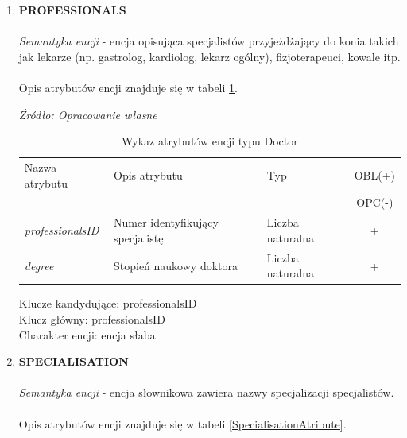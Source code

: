 \documentclass[12pt,twoside]{report}
\begin{document}
\begin{enumerate}[start=1,label={\bfseries ENC\textbackslash0\arabic*}]
	\item \textbf{PROFESSIONALS}\\ \\
	\textit{Semantyka encji} - encja opisująca specjalistów przyjeżdżający do konia takich jak lekarze (np. gastrolog, kardiolog, lekarz ogólny), fizjoterapeuci, kowale itp.
	\\ \\
Opis atrybutów encji znajduje się w tabeli \ref{ProfessionalsAtribute}.

	\begin{table}[H]		
		\caption{Wykaz atrybutów encji typu Doctor }
		\textit{Źródło: Opracowanie własne}
		\label{ProfessionalsAtribute}
		\centering
		\begin{tabular}{|l|l|l|c|}
			\hline
			Nazwa atrybutu & Opis atrybutu & Typ & OBL(+) \\
			& & &  OPC(-) \\
			\hline
			\textit{professionalsID} & Numer identyfikujący specjalistę & Liczba naturalna & + \\
			\hline			
			\textit{degree} & Stopień naukowy doktora & Liczba naturalna & + \\
			\hline
		\end{tabular}

	\end{table}
	Klucze kandydujące: professionalsID \\
	Klucz główny: professionalsID \\
	Charakter encji: encja słaba \\
	\item \textbf{SPECIALISATION}\\ \\
	\textit{Semantyka encji} - encja słownikowa zawiera nazwy specjalizacji specjalistów.
	\\	\\
	Opis atrybutów encji znajduje się w tabeli \ref{SpecialisationAtribute}.
	

\end{enumerate}
\end{document}
